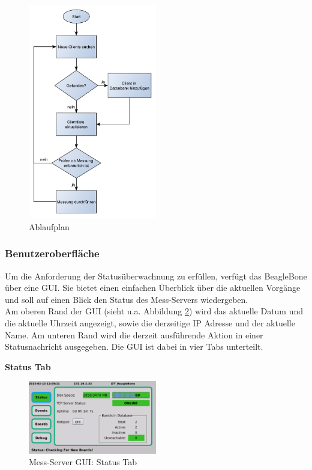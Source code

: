 \begin{figure}[H]
\begin{center}
\includegraphics[width=0.5\textwidth ]{img/general/Ablaufplan_Master.pdf}
\caption{Ablaufplan}
\label{figure_Ablaufplan_Master}
\end{center}
\end{figure}
 
\newpage
\subsubsection{Benutzeroberfläche}
Um die Anforderung der Statusüberwachnung zu erfüllen, verfügt das BeagleBone über eine \ac{GUI}. Sie bietet einen einfachen Überblick über die aktuellen Vorgänge und soll auf einen Blick den Status des Mess-Servers wiedergeben.\\
Am oberen Rand der \ac{GUI} (sieht u.a. Abbildung \ref{figure_MessServerGUIStatus}) wird das aktuelle Datum und die aktuelle Uhrzeit angezeigt, sowie die derzeitige IP Adresse und der aktuelle Name. Am unteren Rand wird die derzeit ausführende Aktion in einer Statusnachricht ausgegeben.
Die \ac{GUI} ist dabei in vier Tabs unterteilt.

\textbf{Status Tab}

\begin{figure}[H]
\begin{center}
\includegraphics[width=0.5\textwidth ]{img/GUI/Server_GUI_Status1.png}
\caption{Mess-Server GUI: Status Tab}
\label{figure_MessServerGUIStatus}
\end{center}
\end{figure}

